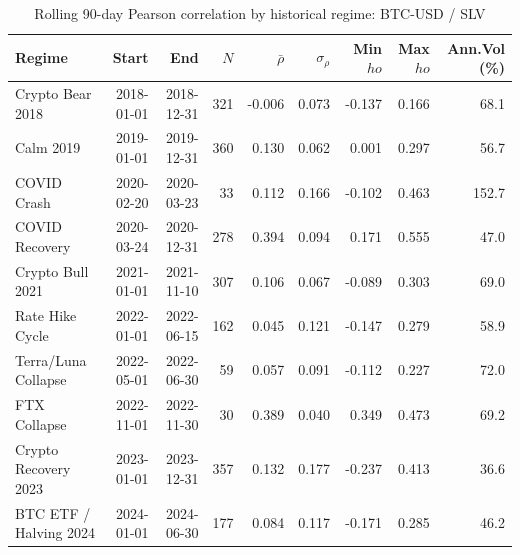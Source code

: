 \begin{table}[H]
\centering
\small
\caption{Rolling 90-day Pearson correlation by historical regime: BTC-USD / SLV}
\label{tab:regime_corr_BTCUSDSLV}
\begin{tabular}{lrrrrrrrr}
\toprule
Regime & Start & End & $N$ & $\bar{\rho}$ & $\sigma_\rho$ & Min $
ho$ & Max $
ho$ & Ann.Vol (\%) \\
\midrule
Crypto Bear 2018 & 2018-01-01 & 2018-12-31 & 321 & -0.006 & 0.073 & -0.137 & 0.166 & 68.1 \\
Calm 2019 & 2019-01-01 & 2019-12-31 & 360 & 0.130 & 0.062 & 0.001 & 0.297 & 56.7 \\
COVID Crash & 2020-02-20 & 2020-03-23 & 33 & 0.112 & 0.166 & -0.102 & 0.463 & 152.7 \\
COVID Recovery & 2020-03-24 & 2020-12-31 & 278 & 0.394 & 0.094 & 0.171 & 0.555 & 47.0 \\
Crypto Bull 2021 & 2021-01-01 & 2021-11-10 & 307 & 0.106 & 0.067 & -0.089 & 0.303 & 69.0 \\
Rate Hike Cycle & 2022-01-01 & 2022-06-15 & 162 & 0.045 & 0.121 & -0.147 & 0.279 & 58.9 \\
Terra/Luna Collapse & 2022-05-01 & 2022-06-30 & 59 & 0.057 & 0.091 & -0.112 & 0.227 & 72.0 \\
FTX Collapse & 2022-11-01 & 2022-11-30 & 30 & 0.389 & 0.040 & 0.349 & 0.473 & 69.2 \\
Crypto Recovery 2023 & 2023-01-01 & 2023-12-31 & 357 & 0.132 & 0.177 & -0.237 & 0.413 & 36.6 \\
BTC ETF / Halving 2024 & 2024-01-01 & 2024-06-30 & 177 & 0.084 & 0.117 & -0.171 & 0.285 & 46.2 \\
\bottomrule
\end{tabular}
\end{table}